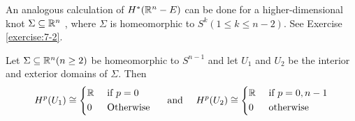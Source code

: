 An analogous calculation of $H^*({\mathbb{R}}^n - E)$ can be done for a higher-dimensional
knot $\Sigma\subseteq{\ensuremath{\mathbb{R}}}^n$ , where $\Sigma$ is homeomorphic to $S^k(1\le k\le n-2)$. 
See Exercise \ref{exercise:7-2}.


\begin{proposition}\label{proposition:7-16}
  Let $\Sigma\subseteq{\ensuremath{\mathbb{R}}}^n (n\ge 2)$ be homeomorphic to $S^{n-1}$ and let $U_1$ and $U_2$ be the 
  interior and exterior domains of $\Sigma$. Then 
  \begin{align*}
    H^p(U_1) \cong \left\{\begin{aligned}
      & {\mathbb{R}} && \text{ if } p = 0 \\
      & 0 && \text{ Otherwise }
    \end{aligned}\right.
    && \text{ and } && 
    H^p(U_2) \cong \left\{\begin{aligned}
      & {\mathbb{R}} && \text{ if } p = 0, n-1 \\
      & 0 && \text{ otherwise }
    \end{aligned}\right.
  \end{align*}
\end{proposition}


